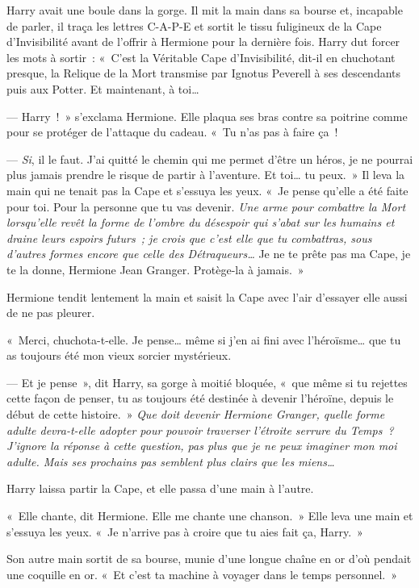 Harry avait une boule dans la gorge. Il mit la main dans sa bourse et, incapable de parler, il traça les lettres C-A-P-E et sortit le tissu fuligineux de la Cape d'Invisibilité avant de l'offrir à Hermione pour la dernière fois. Harry dut forcer les mots à sortir~: «~C'est la Véritable Cape d'Invisibilité, dit-il en chuchotant presque, la Relique de la Mort transmise par Ignotus Peverell à ses descendants puis aux Potter. Et maintenant, à toi…

--- Harry~!~» s'exclama Hermione. Elle plaqua ses bras contre sa poitrine comme pour se protéger de l'attaque du cadeau. «~Tu n'as pas à faire ça~!

--- \emph{Si}, il le faut. J'ai quitté le chemin qui me permet d'être un héros, je ne pourrai plus jamais prendre le risque de partir à l'aventure. Et toi… tu peux.~» Il leva la main qui ne tenait pas la Cape et s'essuya les yeux. «~Je pense qu'elle a été faite pour toi. Pour la personne que tu vas devenir. \emph{Une arme pour combattre la Mort lorsqu'elle revêt la forme de l'ombre du désespoir qui s'abat sur les humains et draine leurs espoirs futurs~; je crois que c'est elle que tu combattras, sous d'autres formes encore que celle des Détraqueurs…} Je ne te prête pas ma Cape, je te la donne, Hermione Jean Granger. Protège-la à jamais.~»

Hermione tendit lentement la main et saisit la Cape avec l'air d'essayer elle aussi de ne pas pleurer.

«~Merci, chuchota-t-elle. Je pense… même si j'en ai fini avec l'héroïsme… que tu as toujours été mon vieux sorcier mystérieux.

--- Et je pense~», dit Harry, sa gorge à moitié bloquée, «~que même si tu rejettes cette façon de penser, tu as toujours été destinée à devenir l'héroïne, depuis le début de cette histoire.~» \emph{Que doit devenir Hermione Granger, quelle forme adulte devra-t-elle adopter pour pouvoir traverser l'étroite serrure du Temps~? J'ignore la réponse à cette question, pas plus que je ne peux imaginer mon moi adulte. Mais ses prochains pas semblent plus clairs que les miens…}

Harry laissa partir la Cape, et elle passa d'une main à l'autre.

«~Elle chante, dit Hermione. Elle me chante une chanson.~» Elle leva une main et s'essuya les yeux. «~Je n'arrive pas à croire que tu aies fait ça, Harry.~»

Son autre main sortit de sa bourse, munie d'une longue chaîne en or d'où pendait une coquille en or. «~Et c'est ta machine à voyager dans le temps personnel.~»

